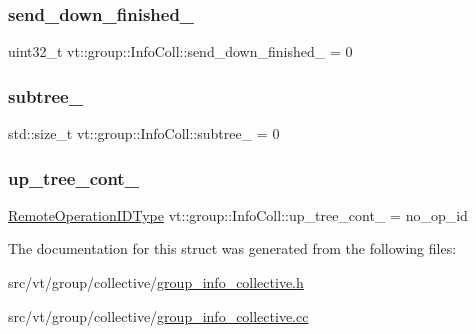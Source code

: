 \subsubsection{\texorpdfstring{send\+\_\+down\+\_\+finished\+\_\+}{send\_down\_finished\_}}
{\footnotesize\ttfamily uint32\+\_\+t vt\+::group\+::\+Info\+Coll\+::send\+\_\+down\+\_\+finished\+\_\+ = 0\hspace{0.3cm}{\ttfamily [protected]}}

\mbox{\label{structvt_1_1group_1_1_info_coll_a42a225abb3f2d734ae4eddaecdb56b9e}} 
\subsubsection{\texorpdfstring{subtree\+\_\+}{subtree\_}}
{\footnotesize\ttfamily std\+::size\+\_\+t vt\+::group\+::\+Info\+Coll\+::subtree\+\_\+ = 0\hspace{0.3cm}{\ttfamily [protected]}}

\mbox{\label{structvt_1_1group_1_1_info_coll_acd4c40fa52015c16a54d9e793cecc700}} 
\subsubsection{\texorpdfstring{up\+\_\+tree\+\_\+cont\+\_\+}{up\_tree\_cont\_}}
{\footnotesize\ttfamily \hyperlink{namespacevt_1_1group_a73f2624ddeb535b39a08b6524f26b244}{Remote\+Operation\+I\+D\+Type} vt\+::group\+::\+Info\+Coll\+::up\+\_\+tree\+\_\+cont\+\_\+ = no\+\_\+op\+\_\+id\hspace{0.3cm}{\ttfamily [private]}}



The documentation for this struct was generated from the following files\+:\begin{DoxyCompactItemize}
\item 
src/vt/group/collective/\hyperlink{group__info__collective_8h}{group\+\_\+info\+\_\+collective.\+h}\item 
src/vt/group/collective/\hyperlink{group__info__collective_8cc}{group\+\_\+info\+\_\+collective.\+cc}\end{DoxyCompactItemize}
